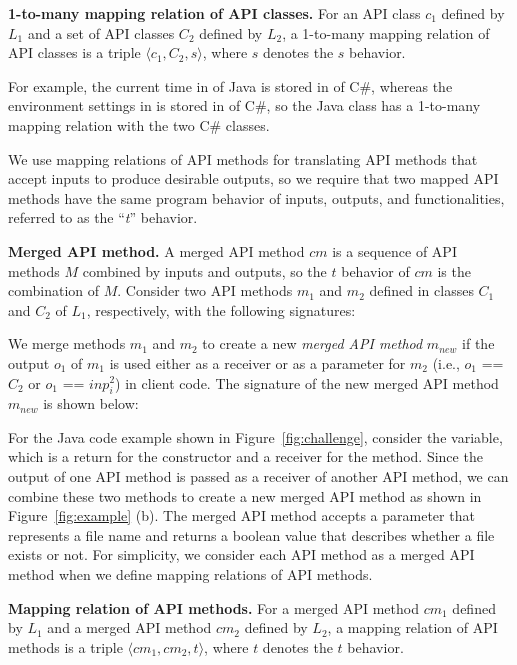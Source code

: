 \textbf{1-to-many mapping relation of API classes.} For an API class
$c_1$ defined by $L_1$ and a set of API classes $C_2$ defined by
$L_2$, a 1-to-many mapping relation of API classes is a triple
$\langle c_1, C_2, s \rangle$, where $s$ denotes the $s$ behavior.

For example, the current time in  of Java
is stored in  of C\#, whereas the
environment settings in  is stored in
 of C\#, so the Java class has a
1-to-many mapping relation with the two C\# classes.

We use mapping relations of API methods for translating API methods
that accept inputs to produce desirable outputs, so we require that two
mapped API methods have the same program behavior of inputs, outputs, and
functionalities, referred to as the ``\emph{t}'' behavior.

\textbf{Merged API method.} A merged API method $cm$ is a sequence of API
methods $M$ combined by inputs and outputs, so the $t$ behavior of
$cm$ is the combination of $M$. Consider two API methods $m_1$ and
$m_2$ defined in classes $C_1$ and $C_2$ of $L_1$, respectively,
with the following signatures:



We merge methods $m_1$ and $m_2$ to create a new \emph{merged API
method} $m_{new}$ if the output $o_1$ of $m_1$ is used either as a
receiver or as a parameter for $m_2$ (i.e., $o_1$ == $C_2$ or $o_1$
== $inp_i^2$) in client code. The signature of the new merged API
method $m_{new}$ is shown below:


For the Java code example shown in Figure~\ref{fig:challenge},
consider the  variable, which is a return for
the constructor and a receiver for the 
method. Since the output of one API method is passed as a receiver 
of another API method, we can combine these two methods to create a
new merged API method  as shown
in Figure~\ref{fig:example} (b). The merged API method accepts a
 parameter that represents a file name and returns a
boolean value that describes whether a file exists or not. For
simplicity, we consider each API method as a merged API method when
we define mapping relations of API methods.

\textbf{Mapping relation of API methods.} For a merged API method
$cm_1$ defined by $L_1$ and a merged API method $cm_2$ defined by
$L_2$, a mapping relation of API methods is a triple $\langle cm_1,
cm_2, t \rangle$, where $t$ denotes the $t$ behavior.
